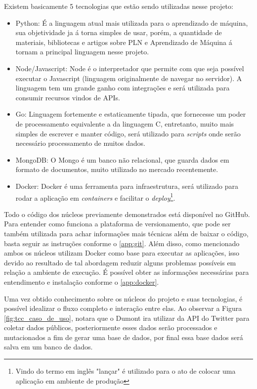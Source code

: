 Existem basicamente 5 tecnologias que estão sendo utilizadas nesse projeto:
\begin{itemize}
 \item Python: É a linguagem atual mais utilizada para o aprendizado de máquina, sua objetividade ja á torna simples de usar, porém, a quantidade de materiais, bibliotecas e artigos sobre PLN e Aprendizado de Máquina á tornam a principal linguagem nesse projeto.
 \item Node/Javascript: Node é o interpretador que permite com que seja possível executar o Javascript (linguagem originalmente de navegar no servidor). A linguagem tem um grande ganho com integrações e será utilizada para consumir recursos vindos de APIs.
 \item Go: Linguagem fortemente e estaticamente tipada, que fornecesse um poder de processamento equivalente a da linguagem C, entretanto, muito mais simples de escrever e manter código, será utilizado para \textit{scripts} onde serão necessário processamento de muitos dados.
 \item MongoDB: O Mongo é um banco não relacional, que guarda dados em formato de documentos, muito utilizado no mercado recentemente.
 \item Docker: Docker é uma ferramenta para infraestrutura, será utilizado para rodar a aplicação em \textit{containers} e facilitar o \textit{deploy}\footnote{Vindo do termo em inglês "lançar" é utilizado para o ato de colocar uma aplicação em ambiente de produção}.
\end{itemize}

Todo o código dos núcleos previamente demonstrados está disponível no GitHub. Para entender como funciona a plataforma de versionamento, que pode ser também utilizada para achar informações mais técnicas além de baixar o código, basta seguir as instruções conforme o \autoref{app:git}. Além disso, como mencionado ambos os núcleos utilizam Docker como base para executar as aplicações, isso devido ao resultado de tal abordagem reduzir alguns problemas possíveis em relação a ambiente de execução. É possível obter as informações necessárias para entendimento e instalação conforme o \autoref{app:docker}.

Uma vez obtido conhecimento sobre os núcleos do projeto e suas tecnologias, é possível idealizar o fluxo completo e interação entre elas. Ao observar a Figura \ref{fig:tcc_caso_de_uso}, notara que o Dumont ira utilizar da API do Twitter para coletar dados públicos, posteriormente esses dados serão processados e mutacionados a fim de gerar uma base de dados, por final essa base dados será salva em um banco de dados.

